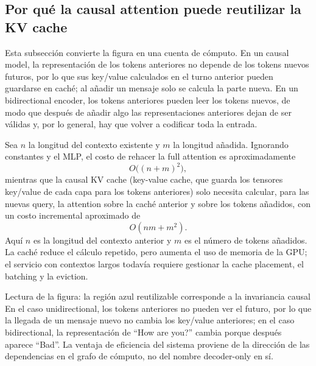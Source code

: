 

\subsection{Por qué la causal attention puede reutilizar la KV cache}

Esta subsección convierte la figura en una cuenta de cómputo. En un causal model, la representación de los tokens anteriores no depende de los tokens nuevos futuros, por lo que sus key/value calculados en el turno anterior pueden guardarse en caché; al añadir un mensaje solo se calcula la parte nueva. En un bidirectional encoder, los tokens anteriores pueden leer los tokens nuevos, de modo que después de añadir algo las representaciones anteriores dejan de ser válidas y, por lo general, hay que volver a codificar toda la entrada.


Sea $n$ la longitud del contexto existente y $m$ la longitud añadida. Ignorando constantes y el MLP, el costo de rehacer la full attention es aproximadamente
\[
O\bigl((n+m)^2\bigr),
\]
mientras que la causal KV cache (key-value cache, que guarda los tensores key/value de cada capa para los tokens anteriores) solo necesita calcular, para las nuevas query, la attention sobre la caché anterior y sobre los tokens añadidos, con un costo incremental aproximado de
\[
O(nm+m^2).
\]
Aquí $n$ es la longitud del contexto anterior y $m$ es el número de tokens añadidos. La caché reduce el cálculo repetido, pero aumenta el uso de memoria de la GPU; el servicio con contextos largos todavía requiere gestionar la cache placement, el batching y la eviction.

\begin{knowledgebox}{Lectura de la figura: la región azul reutilizable corresponde a la invariancia causal}
En el caso unidirectional, los tokens anteriores no pueden ver el futuro, por lo que la llegada de un mensaje nuevo no cambia los key/value anteriores; en el caso bidirectional, la representación de ``How are you?'' cambia porque después aparece ``Bad''. La ventaja de eficiencia del sistema proviene de la dirección de las dependencias en el grafo de cómputo, no del nombre decoder-only en sí.
\end{knowledgebox}

